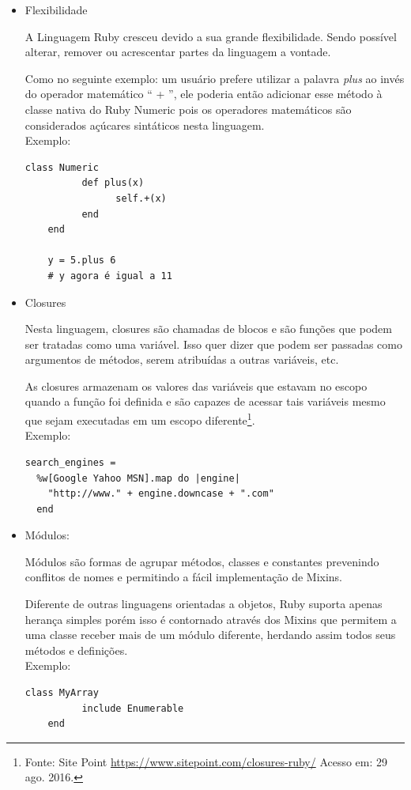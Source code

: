 \begin{itemize}
\item{Flexibilidade}
    \par A Linguagem Ruby cresceu devido a sua grande flexibilidade. Sendo possível alterar, remover ou acrescentar partes da linguagem a vontade.
    \par Como no seguinte exemplo: um usuário prefere utilizar a palavra \emph{plus} ao invés do operador matemático `` + '', ele poderia então adicionar esse método à classe nativa do Ruby Numeric pois os operadores matemáticos são considerados açúcares sintáticos nesta linguagem.
\\Exemplo:
\begin{lstlisting}[frame=single]
class Numeric
          def plus(x)
                self.+(x)
          end
    end

    y = 5.plus 6
    # y agora é igual a 11
\end{lstlisting}
\item{Closures}
\par Nesta linguagem, closures são chamadas de blocos e são funções que podem ser tratadas como uma variável. Isso quer dizer que podem ser passadas como argumentos de métodos, serem atribuídas a outras variáveis, etc.
\par As closures armazenam os valores das variáveis que estavam no escopo quando a função foi definida e são capazes de acessar tais variáveis mesmo que sejam executadas em um escopo diferente\footnote{Fonte: Site Point \url{https://www.sitepoint.com/closures-ruby/} Acesso em: 29 ago. 2016.}.
\\
Exemplo:
\begin{lstlisting}[frame=single]
search_engines =
  %w[Google Yahoo MSN].map do |engine|
    "http://www." + engine.downcase + ".com"
  end
\end{lstlisting}
\item{Módulos:}
\par Módulos são formas de agrupar métodos, classes e constantes prevenindo conflitos de nomes e permitindo a fácil implementação de Mixins.
\par Diferente de outras linguagens orientadas a objetos, Ruby suporta apenas herança simples porém isso é contornado através dos Mixins que permitem a uma classe receber mais de um módulo diferente, herdando assim todos seus métodos e definições.
\\Exemplo:
\begin{lstlisting}[frame=single]
class MyArray
          include Enumerable
    end
\end{lstlisting}

\end{itemize}
